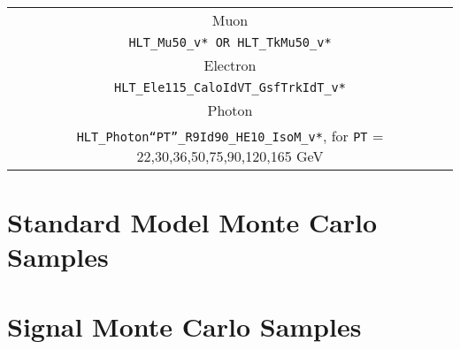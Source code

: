 \begin{table}[htbp!]
   \centering
   \begin{tabular}{ c }
\hline\hline
Muon  \\ \texttt{HLT\_Mu50\_v* OR HLT\_TkMu50\_v*}  \\ \hline
Electron \\ \texttt{HLT\_Ele115\_CaloIdVT\_GsfTrkIdT\_v*} \\ \hline
Photon \\ \texttt{HLT\_Photon``PT''\_R9Id90\_HE10\_IsoM\_v*},  for \texttt{PT} = 22,30,36,50,75,90,120,165 GeV \\  
\hline
\hline
    \end{tabular}
\end{table}

\section{Standard Model Monte Carlo Samples}

\section{Signal Monte Carlo Samples}



